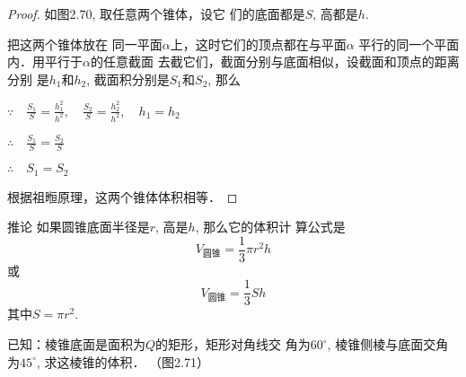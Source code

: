\begin{proof}
如图2.70, 取任意两个锥体，设它
们的底面都是$S$, 高都是$h$.

把这两个锥体放在
同一平面$\alpha$上，这时它们的顶点都在与平面$\alpha$
平行的同一个平面内．用平行于$\alpha$的任意截面
去截它们，截面分别与底面相似，设截面和顶点的距离分别
是$h_1$和$h_2$, 截面积分别是$S_1$和$S_2$, 那么

$\because\quad \frac{S_1}{S}=\frac{h^2_1}{h^2},\quad \frac{S_2}{S}=\frac{h^2_2}{h^2},\quad h_1=h_2$

$\therefore\quad \frac{S_1}{S}=\frac{S_2}{S}$

$\therefore\quad S_1=S_2$

根据祖暅原理，这两个锥体体积相等．
\end{proof}

\begin{blk}
    {推论} 如果圆锥底面半径是$r$, 高是$h$, 那么它的体积计
算公式是
\[V_{\text{圆锥}}=\frac{1}{3}\pi r^2 h\]
或
\[V_{\text{圆锥}}=\frac{1}{3}S h\]
其中$S=\pi r^2$.
\end{blk}




























\begin{example}
    已知：棱锥底面是面积为$Q$的矩形，矩形对角线交
角为$60^{\circ}$, 棱锥侧棱与底面交角为$45^{\circ}$, 求这棱锥的体积．
（图2.71）
\end{example}

\begin{figure}[htp]
    \centering
{}
    \caption{}
\end{figure}

